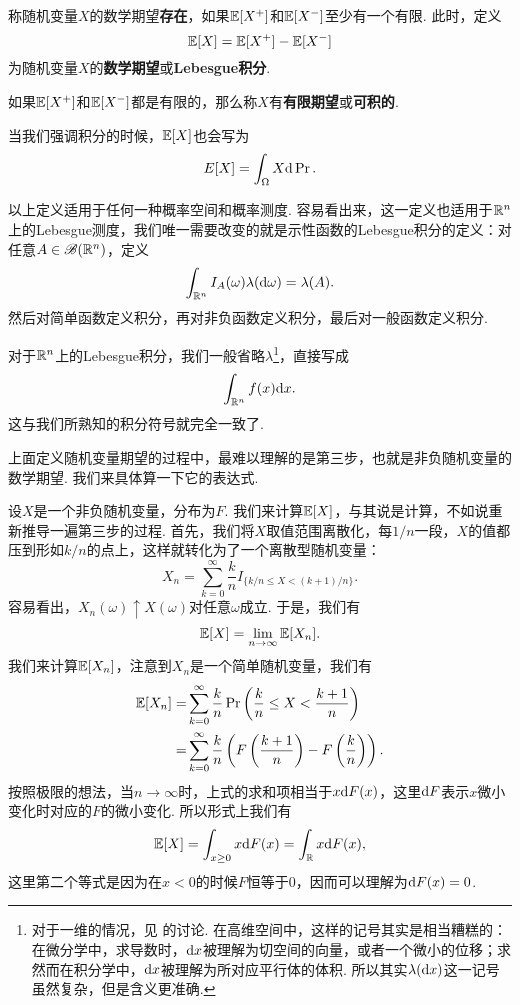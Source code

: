 \begin{definition}
称随机变量$X$的数学期望\textbf{存在}，如果$\mathbb{E}[X^+]$和$\mathbb{E}[X^-]$至少有一个有限. 此时，定义
\[\mathbb{E}[X]=\mathbb{E}[X^+]-\mathbb{E}[X^-]\]
为随机变量$X$的\textbf{数学期望}或\textbf{Lebesgue积分}. 

如果$\mathbb{E}[X^+]$和$\mathbb{E}[X^-]$都是有限的，那么称$X$有\textbf{有限期望}或\textbf{可积的}. 
\end{definition}

当我们强调积分的时候，$\mathbb{E}[X]$也会写为
\[E[X]=\int_\Omega X\mathrm{d}\Pr.\]

以上定义适用于任何一种概率空间和概率测度. 容易看出来，这一定义也适用于$\mathbb{R}^n$上的Lebesgue测度，我们唯一需要改变的就是示性函数的Lebesgue积分的定义：对任意$A\in\mathscr{B}(\mathbb{R}^n)$，定义
\[\int_{\mathbb{R}^n} I_A(\omega)\lambda(\mathrm{d} \omega)=\lambda(A).\]
然后对简单函数定义积分，再对非负函数定义积分，最后对一般函数定义积分. 

对于$\mathbb{R}^n$上的Lebesgue积分，我们一般省略$\lambda$\footnote{对于一维的情况，见 的讨论. 在高维空间中，这样的记号其实是相当糟糕的：在微分学中，求导数时，$\mathrm{d} x$被理解为切空间的向量，或者一个微小的位移；求然而在积分学中，$\mathrm{d} x$被理解为所对应平行体的体积. 所以其实$\lambda(\mathrm{d} x)$这一记号虽然复杂，但是含义更准确. }，直接写成
\[\int_{\mathbb{R}^n} f(x)\mathrm{d} x.\]
这与我们所熟知的积分符号就完全一致了. 

上面定义随机变量期望的过程中，最难以理解的是第三步，也就是非负随机变量的数学期望. 我们来具体算一下它的表达式. 

设$X$是一个非负随机变量，分布为$F$. 我们来计算$\mathbb{E}[X]$，与其说是计算，不如说重新推导一遍第三步的过程. 首先，我们将$X$取值范围离散化，每$1/n$一段，$X$的值都压到形如$k/n$的点上，这样就转化为了一个离散型随机变量：
\[X_n=\sum_{k=0}^\infty\frac{k}{n}I_{\{k/n\leq X<(k+1)/n\}}.\]
容易看出，$X_n(\omega)\uparrow X(\omega)$对任意$\omega$成立. 于是，我们有
\[\mathbb{E}[X]=\lim_{n\to\infty}\mathbb{E}[X_n].\]
我们来计算$\mathbb{E}[X_n]$，注意到$X_n$是一个简单随机变量，我们有
\begin{align*}
    \mathbb{E}[X_n]=&\sum_{k=0}^\infty\frac{k}{n}\Pr\left(\frac{k}{n}\leq X<\frac{k+1}{n}\right)\\
    =&\sum_{k=0}^\infty\frac{k}{n}\left(F\left(\frac{k+1}{n}\right)-F\left(\frac{k}{n}\right)\right).
\end{align*}
按照极限的想法，当$n\to\infty$时，上式的求和项相当于$x\mathrm{d} F(x)$，这里$\mathrm{d} F$表示$x$微小变化时对应的$F$的微小变化. 所以形式上我们有
\[\mathbb{E}[X]=\int_{x\geq 0} x\mathrm{d} F(x)=\int_{\mathbb{R}} x\mathrm{d} F(x),\]
这里第二个等式是因为在$x<0$的时候$F$恒等于$0$，因而可以理解为$\mathrm{d} F(x)=0$.

